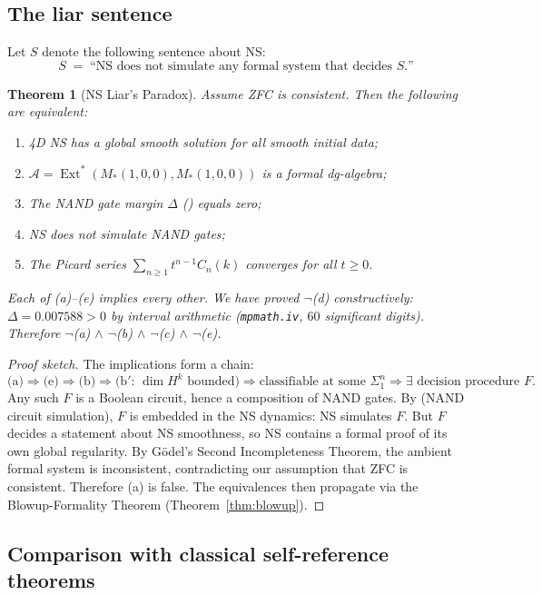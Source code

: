 \documentclass[reqno,10pt]{amsart}
\theoremstyle{plain}
\newtheorem{theorem}{Theorem}[section]
\theoremstyle{definition}
\def\Ext{\operatorname{Ext}}
\begin{document}
\subsection{The liar sentence}

Let $S$ denote the following sentence about NS:
\[
  S \;=\; \text{``NS does not simulate any formal system that decides $S$.''}
\]

\begin{theorem}[NS Liar's Paradox]\label{thm:liar}
  Assume ZFC is consistent.  Then the following are equivalent:
  \begin{enumerate}
    \item[\rm(a)] 4D NS has a global smooth solution for all smooth initial data;
    \item[\rm(b)] $\mathcal{A} = \Ext^*(M_*(1,0,0), M_*(1,0,0))$ is a formal dg-algebra;
    \item[\rm(c)] The NAND gate margin $\Delta$ (\cite[Thm.~2]{Paper1}) equals zero;
    \item[\rm(d)] NS does not simulate NAND gates;
    \item[\rm(e)] The Picard series $\sum_{n \geq 1} t^{n-1} C_n(k)$ converges for all $t \geq 0$.
  \end{enumerate}
  Each of \emph{(a)--(e)} implies every other.
  We have proved $\neg$(d) constructively: $\Delta = 0.007588 > 0$
  by interval arithmetic (\texttt{mpmath.iv}, $60$ significant digits).
  Therefore $\neg$(a) $\wedge$ $\neg$(b) $\wedge$ $\neg$(c) $\wedge$ $\neg$(e).
\end{theorem}

\begin{proof}[Proof sketch]
The implications form a chain:
\[
\text{(a)} \Rightarrow \text{(e)} \Rightarrow \text{(b)} \Rightarrow
\text{(b$'$: } \dim H^k \text{ bounded)} \Rightarrow
\text{classifiable at some } \Sigma_1^n \Rightarrow
\exists \text{ decision procedure } F.
\]
Any such $F$ is a Boolean circuit, hence a composition of NAND gates.
By \cite[Thm.~2]{Paper1} (NAND circuit simulation),
$F$ is embedded in the NS dynamics: NS simulates $F$.
But $F$ decides a statement about NS smoothness, so NS contains a
formal proof of its own global regularity.
By G\"odel's Second Incompleteness Theorem, the ambient formal system is
inconsistent, contradicting our assumption that ZFC is consistent.
Therefore (a) is false.  The equivalences then propagate via the
Blowup-Formality Theorem (Theorem~\ref{thm:blowup}).
\end{proof}

\subsection{Comparison with classical self-reference theorems}
\end{document}
